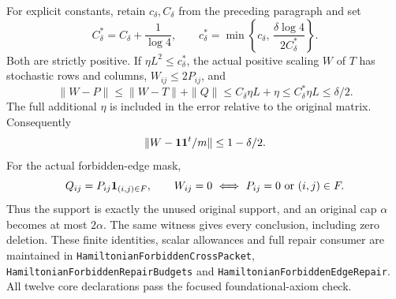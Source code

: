 For explicit constants, retain \(c_\delta,C_\delta\) from the
preceding paragraph and set
\[
 C_\delta^*=C_\delta+\frac1{\log4},\qquad
 c_\delta^*=\min\left\{c_\delta,\,
           \frac{\delta\log4}{2C_\delta^*}\right\}.
\]
Both are strictly positive. If
\(\eta L^2\leq c_\delta^*\), the actual positive scaling \(W\)
of \(T\) has stochastic rows and columns, \(W_{ij}\leq2P_{ij}\),
and
\[
 \|W-P\|
 \leq\|W-T\|+\|Q\|
 \leq C_\delta\eta L+\eta
 \leq C_\delta^*\eta L\leq\delta/2.
\]
The full additional \(\eta\) is included in the error relative
to the original matrix.
Consequently
\[
 \|W-\mathbf1\mathbf1^t/m\|\leq1-\delta/2.
\]
For the actual forbidden-edge mask,
\[
 Q_{ij}=P_{ij}\mathbf1_{(i,j)\in F},\qquad
 W_{ij}=0\ \Longleftrightarrow\
                P_{ij}=0\ \hbox{or}\ (i,j)\in F.
\]
Thus the support is exactly the unused original support, and an
original cap \(\alpha\) becomes at most \(2\alpha\).
The same witness gives every conclusion, including zero deletion.
These finite identities, scalar allowances and full repair consumer
are maintained in \texttt{HamiltonianForbiddenCrossPacket},
\texttt{HamiltonianForbiddenRepairBudgets} and
\texttt{HamiltonianForbiddenEdgeRepair}.
All twelve core declarations pass the focused foundational-axiom
check.
